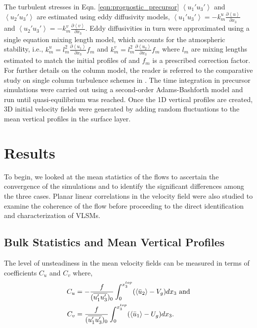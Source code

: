 The turbulent stresses in Eqn. \ref{eqn:prognostic_precursor} $\left < u_{1}'u_{3}' \right >$ and $\left < u_{2}'u_{3}' \right >$ are estimated using eddy diffusivity models, $\left < u_{1}'u_{3}' \right > = -k_{m}^{u}\frac{\partial \left < u \right >}{\partial x_3}$ and $\left < u_{2}'u_{3}' \right > =-k_m^{v}\frac{\partial \left < v \right >}{\partial x_3}$. Eddy diffusivities in turn were approximated using a single equation mixing length model, which accounts for the atmospheric stability, i.e., $k_m^{u} = l_m^2\frac{\partial \left < u_{1} \right >}{\partial x_3}f_m$ and $k_m^{v} = l_m^2\frac{\partial \left < u_{2}\right >}{\partial x_3}f_m$ where $l_m$ are mixing lengths estimated to match the initial profiles of \citet{andren_brown_qjrm_94} and $f_m$ is a prescribed correction factor. For further details on the column model, the reader is referred to the comparative study on single column turbulence schemes in \citet{cuxart_blm_2006}. The time integration in precursor simulations were carried out using a second-order Adams-Bashforth model and run until quasi-equilibrium was reached. Once the 1D vertical profiles are created, 3D initial velocity fields were generated by adding random fluctuations to the mean vertical profiles in the surface layer. 

\section{Results}
To begin, we looked at the mean statistics of the flows to ascertain the convergence of the simulations and to identify the significant differences among the three cases. Planar linear correlations in the velocity field were also studied to examine the coherence of the flow before proceeding to the direct identification and characterization of VLSMs. 
\subsection{Bulk Statistics and Mean Vertical Profiles}

The level of unsteadiness in the mean velocity fields can be measured in terms of  coefficients $C_u$ and $C_v$ where, 
\begin{align}
C_u & = -\frac{f}{(\overline{u_{1}'u_{3}'})_{0}}\int_{0}^{x_3^{top}}(\left< \bar{u}_{2} \right > - V_g)dx_3 \ \text{and} \notag \\
C_v & = \frac{f}{(\overline{u_{1}'u_{3}'})_0}\int_{0}^{x_3^{top}}(\left< \bar{u}_{1} \right > - U_g)dx_3. 
\label{eqn:cu-cv}
\end{align}

